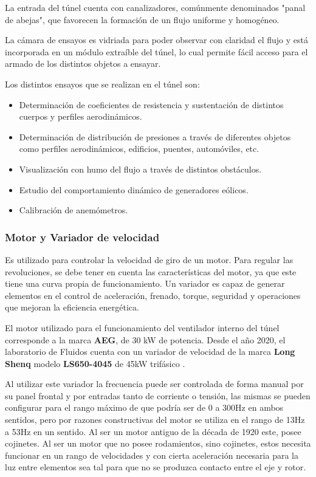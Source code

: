 	La entrada del túnel cuenta con canalizadores, comúnmente denominados "panal de abejas", que favorecen la formación de un flujo uniforme y homogéneo.
	
	La cámara de ensayos es vidriada para poder observar con claridad el flujo y está incorporada en un módulo extraíble del túnel, lo cual permite fácil acceso para el armado de los distintos objetos a ensayar.
	
	Los distintos ensayos que se realizan en el túnel son:
	\begin{itemize}
		\item  Determinación de coeficientes de resistencia y sustentación de distintos cuerpos y perfiles aerodinámicos. 
		\item Determinación de distribución de presiones a través de diferentes objetos como perfiles aerodinámicos, edificios, puentes, automóviles, etc.
		\item Visualización con humo del flujo a través de distintos obstáculos.
		\item Estudio del comportamiento dinámico de generadores eólicos. 
		\item Calibración de anemómetros.
	\end{itemize}

	\subsubsection{Motor y Variador de velocidad}
		\begin{tcolorbox}[colback=blue!5!white,colframe=blue!75!black,title=Variador de velocidad]
			Es utilizado para controlar la velocidad de giro de un motor. Para regular las revoluciones, se debe tener en cuenta las características del motor, ya que este tiene  una  curva  propia  de  funcionamiento.  Un  variador  es  capaz  de  generar elementos en el  control  de  aceleración,  frenado, torque,  seguridad  y operaciones que mejoran la eficiencia energética.\end{tcolorbox}	

		
El motor utilizado para el funcionamiento del ventilador interno del túnel corresponde a la marca \textbf{AEG}, de 30 kW de potencia\cite{barila1993desarrollo}. Desde el año 2020, el laboratorio de Fluidos cuenta con un variador de velocidad de la marca \textbf{Long Shenq} modelo \textbf{LS650-4045} de 45kW trifásico \cite{LS650}.
 
Al utilizar este variador la frecuencia puede ser controlada de forma manual por su panel frontal y por entradas tanto de corriente o tensión, las mismas se pueden configurar para el rango máximo de que podría ser de 0 a 300Hz en ambos sentidos, pero por razones constructivas del motor se utiliza en el rango de 13Hz a 53Hz en un sentido. Al ser un motor antiguo de la década de 1920 este, posee cojinetes.  Al ser un motor que no posee rodamientos, sino cojinetes, estos necesita funcionar en un rango de velocidades y con cierta aceleración necesaria para la luz entre elementos sea tal para que no se produzca contacto entre el eje y rotor.


